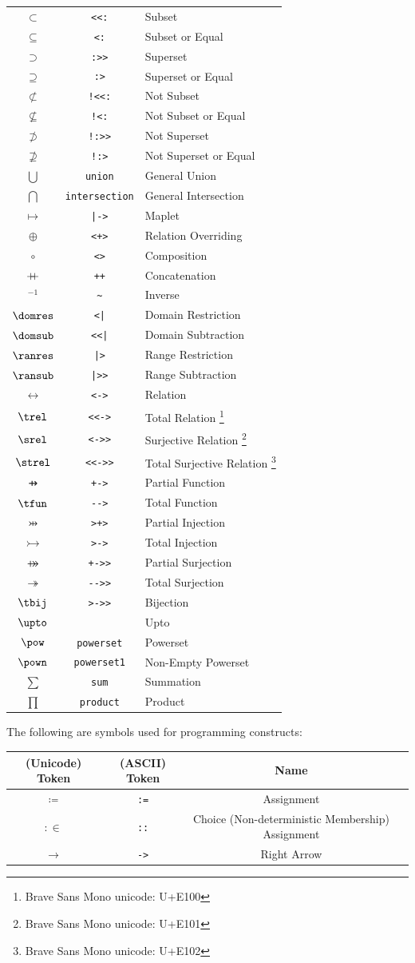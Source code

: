 \documentclass{article}
\newcommand{\concat}{%
  \mathbin{{+}\mspace{-8mu}{+}}%
}
\newcommand{\lexentry}[3]{%
  \ensuremath{#1} & \texttt{#2} & #3\\%
}
\begin{document}
\begin{center}
\begin{longtable}{c c l}
    \lexentry{\subset}{<{}<:}{Subset}
    \lexentry{\subseteq}{<:}{Subset or Equal}
    \lexentry{\supset}{:>{}>}{Superset}
    \lexentry{\supseteq}{:>}{Superset or Equal}
    \lexentry{\not\subset}{!<{}<:}{Not Subset}
    \lexentry{\not\subseteq}{!<:}{Not Subset or Equal}
    \lexentry{\not\supset}{!:>{}>}{Not Superset}
    \lexentry{\not\supseteq}{!:>}{Not Superset or Equal}
    \lexentry{\bigcup}{union}{General Union}
    \lexentry{\bigcap}{intersection}{General Intersection}
    \lexentry{\mapsto}{|->}{Maplet}
    \lexentry{\oplus}{<+>}{Relation Overriding} %
    \lexentry{\circ}{<>}{Composition}
    \lexentry{\concat}{++}{Concatenation}
    \lexentry{^{-1}}{\~}{Inverse}
    \lexentry{\domres}{<|}{Domain Restriction}
    \lexentry{\domsub}{<{}<|}{Domain Subtraction}
    \lexentry{\ranres}{|>}{Range Restriction}
    \lexentry{\ransub}{|>{}>}{Range Subtraction}
    \lexentry{\rel}{<->}{Relation}
    \lexentry{\trel}{<{}<->}{Total Relation \footnote{Brave Sans Mono unicode: U+E100}}
    \lexentry{\srel}{<->{}>}{Surjective Relation \footnote{Brave Sans Mono unicode: U+E101}}
    \lexentry{\strel}{<{}<->{}>}{Total Surjective Relation \footnote{Brave Sans Mono unicode: U+E102}}
    \lexentry{\pfun}{+->}{Partial Function}
    \lexentry{\tfun}{-{}->}{Total Function}
    \lexentry{\pinj}{>+>}{Partial Injection}
    \lexentry{\tinj}{>->}{Total Injection}
    \lexentry{\psur}{+->{}>}{Partial Surjection}
    \lexentry{\tsur}{-{}->{}>}{Total Surjection}
    \lexentry{\tbij}{>->{}>}{Bijection}
    \lexentry{\upto}{}{Upto}
    \lexentry{\pow}{powerset}{Powerset}
    \lexentry{\pown}{powerset1}{Non-Empty Powerset}
    \lexentry{\sum}{sum}{Summation}
    \lexentry{\prod}{product}{Product}
\end{longtable}
\end{center}

The following are symbols used for programming constructs:
\begin{center}
\begin{longtable}{c c c c}
    \textbf{(Unicode) Token} & \textbf{(ASCII) Token} & \textbf{Name} \\
    \endhead
    \lexentry{\coloneqq}{:=}{Assignment}
    \lexentry{:\in}{::}{Choice (Non-deterministic Membership) Assignment}
    \lexentry{\rightarrow}{->}{Right Arrow}
\end{longtable}
\end{center}
\end{document}
